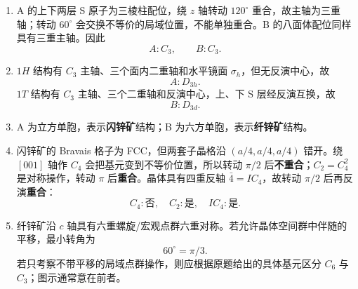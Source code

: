 \begin{question}[16 分]
\begin{solution}
\begin{enumerate}
  \item A 的上下两层 S 原子为三棱柱配位，绕 $z$ 轴转动 $120^\circ$ 重合，故主轴为三重轴；转动 $60^\circ$ 会交换不等价的局域位置，不能单独重合。B 的八面体配位同样具有三重主轴。因此
  \[
    \boxed{A:C_3,\qquad B:C_3.}
  \]
  \item $1H$ 结构有 $C_3$ 主轴、三个面内二重轴和水平镜面 $\sigma_h$，但无反演中心，故
  \[
    \boxed{A:D_{3h}.}
  \]
  $1T$ 结构有 $C_3$ 主轴、三个二重轴和反演中心，上、下 S 层经反演互换，故
  \[
    \boxed{B:D_{3d}.}
  \]
  \item A 为立方单胞，表示\textbf{闪锌矿}结构；B 为六方单胞，表示\textbf{纤锌矿}结构。
  \item 闪锌矿的 Bravais 格子为 FCC，但两套子晶格沿 $(a/4,a/4,a/4)$ 错开。绕 $[001]$ 轴作 $C_4$ 会把基元变到不等价位置，所以转动 $\pi/2$ 后\textbf{不重合}；$C_2=C_4^2$ 是对称操作，转动 $\pi$ 后\textbf{重合}。晶体具有四重反轴 $\bar4=IC_4$，故转动 $\pi/2$ 后再反演\textbf{重合}：
  \[
    \boxed{C_4:\text{否},\quad C_2:\text{是},\quad IC_4:\text{是}.}
  \]
  \item 纤锌矿沿 $c$ 轴具有六重螺旋/宏观点群六重对称。若允许晶体空间群中伴随的平移，最小转角为
  \[
    \boxed{60^\circ=\pi/3.}
  \]
  若只考察不带平移的局域点群操作，则应根据原题给出的具体基元区分 $C_6$ 与 $C_3$；图示通常意在前者。
\end{enumerate}
\end{solution}
\end{question}

